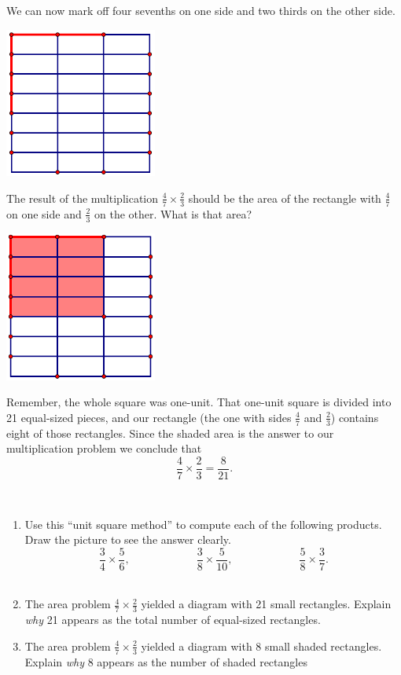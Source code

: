 \begin{example}
We can now mark off four sevenths on one side  and two thirds on the other side.
\begin{center}
\includegraphics[width = 5cm]{unitsqdiv3}
\end{center}
The result of the multiplication $\frac 4 7 \times \frac 2 3$ should be the area of the rectangle with $\frac 47$ on one side and $\frac 23 $ on the other.  What is that area?
\begin{center}
\includegraphics[width = 5cm]{areamodel2}
\end{center}
Remember, the whole square was one-unit.  That one-unit square is divided into 21 equal-sized pieces, and our rectangle (the one with sides $\frac 4 7$ and $\frac 2 3$) contains eight of those rectangles. 
Since the shaded area is the answer to our multiplication problem we conclude that
\[
\frac 47 \times \frac 23 = \frac 8{21}.
\]
\end{example}


\begin{thinkpair*}\ 

\begin{enumerate}
\item
Use this ``unit square method'' to compute each of the following products. 
Draw the picture to
see the answer clearly.
\[
\frac 3 4 \times \frac 5 6,
\qquad\qquad\qquad
\frac 3 8 \times \frac 5{10},
\qquad\qquad\qquad
\frac 5 8 \times \frac 3 7 .
\]\\

\item
The area problem $\frac 4 7 \times \frac 2 3$
yielded a diagram with 21 small rectangles. 
Explain \emph{why} 21 appears as the total number of equal-sized rectangles.\\


\item
The area problem $\frac 4 7 \times \frac 2 3$
yielded a diagram with 8 small shaded rectangles. 
Explain \emph{why} 8 appears as the number of shaded rectangles\\
\end{enumerate}

\end{thinkpair*}


